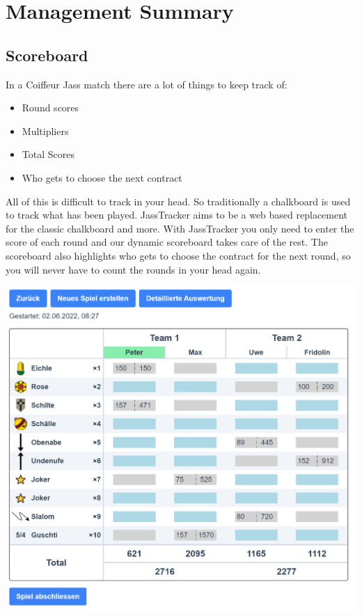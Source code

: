 \chapter*{Management Summary}

\section*{Scoreboard}
In a Coiffeur Jass match there are a lot of things to keep track of:

\begin{itemize}
    \item Round scores
    \item Multipliers
    \item Total Scores
    \item Who gets to choose the next contract
\end{itemize}

All of this is difficult to track in your head. So traditionally a chalkboard is used to track what has been played. JassTracker aims to be a web based replacement for the classic chalkboard and more. With JassTracker you only need to enter the score of each round and our dynamic scoreboard takes care of the rest. The scoreboard also highlights who gets to choose the contract for the next round, so you will never have to count the rounds in your head again.

\includegraphics[height=0.4\textheight]{resources/screenshots/scoreboard}

